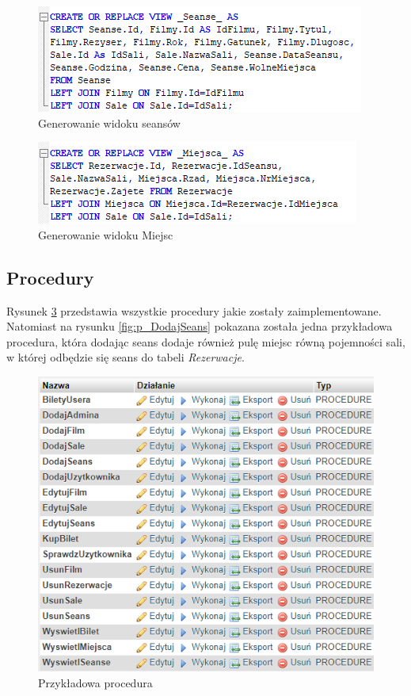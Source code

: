 \begin{figure} [H]
	\centering
	\includegraphics[width=0.6\linewidth]{rozdzial04/V_Seanse_.png}
	\caption{Generowanie widoku seansów}
	\label{fig:v_seanse}
\end{figure}

\begin{figure} [H]
	\centering
	\includegraphics[width=0.6\linewidth]{rozdzial04/V_Miejsca_.png}
	\caption{Generowanie widoku Miejsc}
	\label{fig:v_miejsca}
\end{figure}

\subsection{Procedury}

Rysunek \ref{fig:procedury} przedstawia wszystkie procedury jakie zostały zaimplementowane. Natomiast na rysunku \ref{fig:p_DodajSeans} pokazana została jedna przykładowa procedura, która dodając seans dodaje również pulę miejsc równą pojemności sali, w której odbędzie się seans do tabeli \textit{Rezerwacje}.
\begin{figure} [H]
	\centering
	\includegraphics[width=0.7\linewidth]{rozdzial04/Procedury.png}
	\caption{Przykładowa procedura}
	\label{fig:procedury}
\end{figure}

